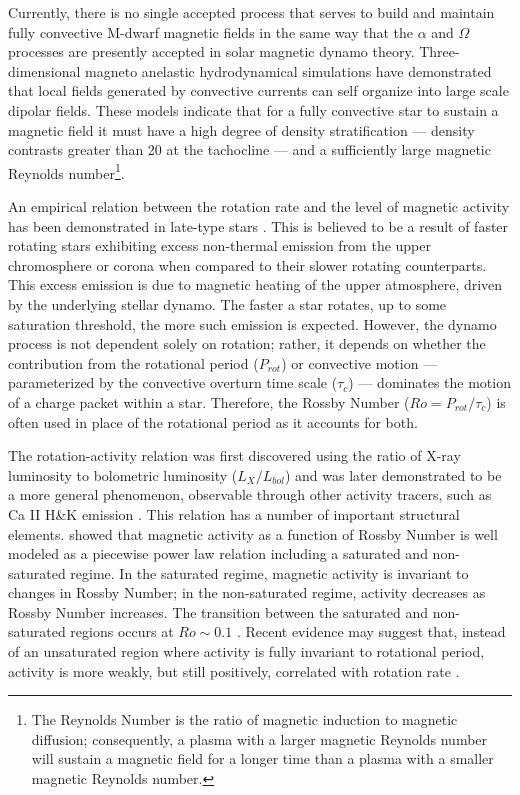 Currently, there is no single accepted process that serves to build and
maintain fully convective M-dwarf magnetic fields in the same way that the
$\alpha$ and $\Omega$ processes are presently accepted in solar magnetic dynamo
theory. Three-dimensional magneto anelastic hydrodynamical simulations have
demonstrated that local fields generated by convective currents can self
organize into large scale dipolar fields. 
These models indicate that for a fully convective star to sustain a magnetic
field it must have a high degree of density stratification --- density
contrasts greater than 20 at the tachocline --- and a sufficiently large magnetic Reynolds
number\footnote{The Reynolds Number is the ratio of magnetic induction to
magnetic diffusion; consequently, a plasma with a larger magnetic Reynolds
number will  sustain a magnetic field for a longer time than a plasma with a
smaller magnetic Reynolds number.}.

An empirical relation between the rotation rate and the level of magnetic
activity has been demonstrated in late-type stars \citep{Skumanich1972, Pal81}. This is
believed to be a result of faster rotating stars exhibiting excess non-thermal
emission from the upper chromosphere or corona when compared to their slower
rotating counterparts. This excess emission is due to magnetic heating of the
upper atmosphere, driven by the underlying stellar dynamo.
The faster a star rotates, up to some saturation threshold, the more such emission is expected. However,
the dynamo process is not dependent solely on rotation; rather, it depends on
whether the contribution from the rotational period ($P_{rot}$) or convective
motion --- parameterized by the convective overturn time scale ($\tau_{c}$) ---
dominates the motion of a charge packet within a star. Therefore, the Rossby
Number ($Ro = P_{rot}/\tau_{c}$) is often used in place of the rotational
period as it accounts for both.

The rotation-activity relation was first discovered using the ratio of X-ray
luminosity to bolometric luminosity ($L_{X}/L_{bol}$) \citep{Pal81} and was
later demonstrated to be a more general phenomenon, observable through other
activity tracers, such as Ca II H\&K emission \citep{Vilhu1984}. This relation has
a number of important structural elements. \citet{Noy84} showed that magnetic
activity as a function of Rossby Number is well modeled as a piecewise power
law relation including a saturated and non-saturated regime. In the saturated
regime, magnetic activity is invariant to changes in Rossby Number; in the
non-saturated regime, activity decreases as Rossby Number increases. The
transition between the saturated and non-saturated regions occurs at $Ro \sim
0.1$ \citep[e.g.][]{Wri11}. Recent evidence may suggest that, instead of an
unsaturated region where activity is fully invariant to rotational period,
activity is more weakly, but still positively, correlated with rotation rate
\citep{Mamajek2008, Reiners2014, Leh20, Magaudda2020}. 

